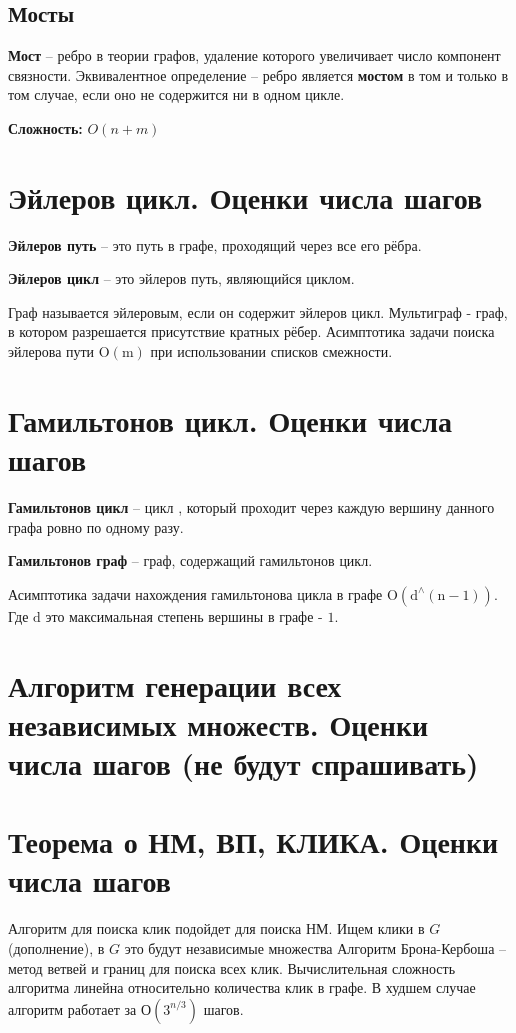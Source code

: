 \documentclass[40pt]{article}
\begin{document}
\subsection{Мосты}

\textbf{Мост} -- ребро в теории графов, удаление которого увеличивает число компонент связности. Эквивалентное определение -- ребро является \textbf{мостом} в том и только в том случае, если оно не содержится ни в одном цикле.

\textbf{Сложность: } $O(n + m)$

\section{Эйлеров цикл.  Оценки числа шагов}

\textbf{Эйлеров путь} -- это путь в графе, проходящий через все его рёбра.

\textbf{Эйлеров цикл} -- это эйлеров путь, являющийся циклом.

Граф называется эйлеровым, если он содержит эйлеров цикл.
Мультиграф - граф, в котором разрешается присутствие кратных рёбер.
Асимптотика задачи поиска эйлерова пути $\mathrm{O}(\mathrm{m})$ при использовании списков смежности.


\section{Гамильтонов цикл.  Оценки числа шагов}

\textbf{Гамильтонов цикл} -- цикл , который проходит через каждую вершину данного графа ровно по одному разу.

\textbf{Гамильтонов граф} -- граф, содержащий гамильтонов цикл.

Асимптотика задачи нахождения гамильтонова цикла в графе $\mathrm{O}\left(\mathrm{d}^{\wedge}(\mathrm{n}-1)\right)$. Где $\mathrm{d}$ это максимальная степень вершины в графе - $1 .$

\section{Алгоритм генерации всех независимых множеств.  Оценки числа шагов (не будут спрашивать)}

\section{Теорема о НМ, ВП, КЛИКА.  Оценки числа шагов}

Алгоритм для поиска клик подойдет для поиска НМ. Ищем клики в $G$ (дополнение), в $G$ это будут независимые множества Алгоритм Брона-Кербоша -- метод ветвей и границ для поиска всех клик. Вычислительная сложность алгоритма линейна относительно количества клик в графе. В худшем случае алгоритм работает за $О(3^{n/3})$ шагов.
\end{document}
